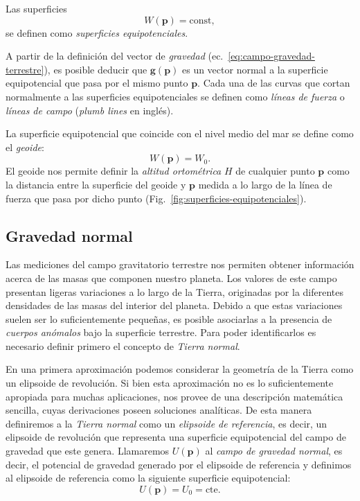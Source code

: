 Las superficies
%
\begin{equation}
    W(\mathbf{p}) = \text{const},
\end{equation}
%
se definen como \emph{superficies equipotenciales}.

A partir de la definición del vector de \emph{gravedad}
(ec.~\ref{eq:campo-gravedad-terrestre}), es posible deducir que
$\mathbf{g}(\mathbf{p})$ es un vector normal a la superficie equipotencial que
pasa por el mismo punto $\mathbf{p}$.
Cada una de las curvas que cortan normalmente a las superficies equipotenciales
se definen como \emph{líneas de fuerza} o \emph{líneas de campo}
(\emph{plumb lines} en inglés).

La superficie equipotencial que coincide con el nivel medio del mar se define
como el \emph{geoide}:
%
\begin{equation}
    W(\mathbf{p}) = W_0.
\end{equation}
%
El geoide nos permite definir la \emph{altitud ortométrica} $H$ de
cualquier punto $\mathbf{p}$ como la distancia entre la superficie del geoide
y $\mathbf{p}$ medida a lo largo de la línea de fuerza que pasa por dicho
punto (Fig.~\ref{fig:superficies-equipotenciales}).


\subsection{Gravedad normal}

Las mediciones del campo gravitatorio terrestre nos permiten obtener
información acerca de las masas que componen nuestro planeta.
Los valores de este campo presentan ligeras variaciones a lo largo de la
Tierra, originadas por la diferentes densidades de las masas del interior del
planeta.
Debido a que estas variaciones suelen ser lo suficientemente pequeñas, es
posible asociarlas a la presencia de \emph{cuerpos anómalos} bajo la superficie
terrestre.
Para poder identificarlos es necesario definir primero el concepto de
\emph{Tierra normal}.

En una primera aproximación podemos considerar la geometría de la Tierra como
un elipsoide de revolución. Si bien esta aproximación no es lo suficientemente
apropiada para muchas aplicaciones, nos provee de una descripción matemática
sencilla, cuyas derivaciones poseen soluciones analíticas.
De esta manera definiremos a la \emph{Tierra normal} como un \emph{elipsoide de
referencia}, es decir, un elipsoide de revolución que representa una superficie
equipotencial del campo de gravedad que este genera. Llamaremos $U(\mathbf{p})$
al \emph{campo de gravedad normal}, es decir, el potencial de gravedad generado
por el elipsoide de referencia y definimos al elipsoide de referencia como la
siguiente superficie equipotencial:
%
\begin{equation}
    U(\mathbf{p}) = U_0 = \text{cte}.
\end{equation}

